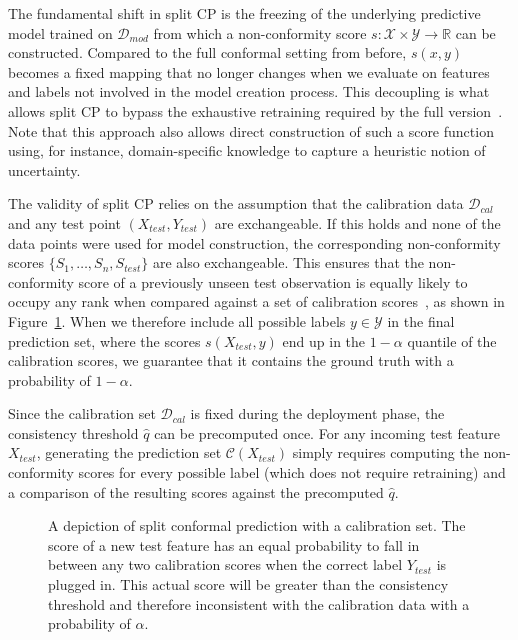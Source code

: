 The fundamental shift in split \gls{CP} is the freezing of the underlying predictive model trained on $\mathcal{D}_{mod}$ from which a non-conformity score $s: \mathcal{X} \times \mathcal{Y} \rightarrow \mathbb{R}$ can be constructed. Compared to the full conformal setting from before, $s(x, y)$ becomes a fixed mapping that no longer changes when we evaluate on features and labels not involved in the model creation process. This decoupling is what allows split \gls{CP} to bypass the exhaustive retraining required by the full version~\cite{Angelopoulos-ConformalPredictionTheory-2025}. Note that this approach also allows direct construction of such a score function using, for instance, domain-specific knowledge to capture a heuristic notion of uncertainty. 

The validity of split \gls{CP} relies on the assumption that the calibration data $\mathcal{D}_{cal}$ and any test point $(X_{test}, Y_{test})$ are exchangeable. If this holds and none of the data points were used for model construction, the corresponding non-conformity scores $\{S_1, \dots, S_n, S_{test}\}$ are also exchangeable. This ensures that the non-conformity score of a previously unseen test observation is equally likely to occupy any rank when compared against a set of calibration scores~\cite{Angelopoulus-ConformalPrediction-2023}, as shown in Figure~\ref{fig:split_conformal_prediction}. When we therefore include all possible labels $y \in \mathcal{Y}$ in the final prediction set, where the scores $s(X_{test}, y)$ end up in the $1 - \alpha$ quantile of the calibration scores, we guarantee that it contains the ground truth with a probability of $1 - \alpha$.

Since the calibration set $\mathcal{D}_{cal}$ is fixed during the deployment phase, the consistency threshold $\hat{q}$ can be precomputed once. For any incoming test feature $X_{test}$, generating the prediction set $\mathcal{C}(X_{test})$ simply requires computing the non-conformity scores for every possible label (which does not require retraining) and a comparison of the resulting scores against the precomputed $\hat{q}$.

\begin{figure}[t]
    \centering
    
    \caption{A depiction of split conformal prediction with a calibration set. The score of a new test feature has an equal probability to fall in between any two calibration scores when the correct label $Y_{test}$ is plugged in. This actual score will be greater than the consistency threshold and therefore inconsistent with the calibration data with a probability of $\alpha$.}
    \label{fig:split_conformal_prediction}
\end{figure}

